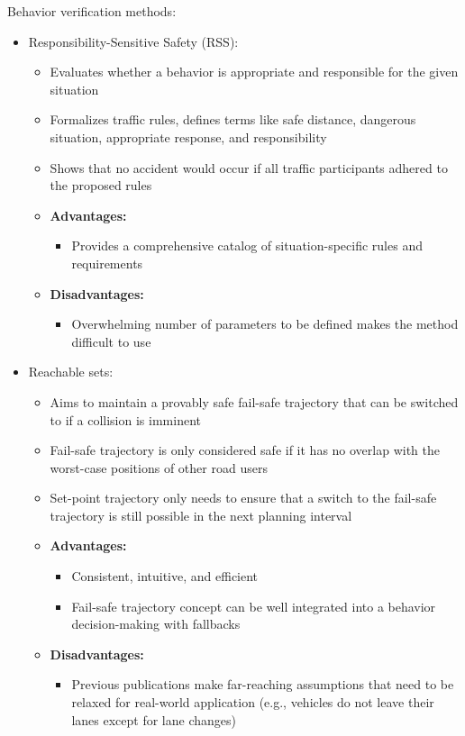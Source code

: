 Behavior verification methods:
\begin{itemize}
    \item Responsibility-Sensitive Safety (RSS):
          \begin{itemize}
              \item Evaluates whether a behavior is appropriate and responsible for the given situation
              \item Formalizes traffic rules, defines terms like safe distance, dangerous situation, appropriate response, and responsibility
              \item Shows that no accident would occur if all traffic participants adhered to the proposed rules
              \item \textbf{Advantages:}
                    \begin{itemize}
                        \item Provides a comprehensive catalog of situation-specific rules and requirements
                    \end{itemize}
              \item \textbf{Disadvantages:}
                    \begin{itemize}
                        \item Overwhelming number of parameters to be defined makes the method difficult to use
                    \end{itemize}
          \end{itemize}
    \item Reachable sets:
          \begin{itemize}
              \item Aims to maintain a provably safe fail-safe trajectory that can be switched to if a collision is imminent
              \item Fail-safe trajectory is only considered safe if it has no overlap with the worst-case positions of other road users
              \item Set-point trajectory only needs to ensure that a switch to the fail-safe trajectory is still possible in the next planning interval
              \item \textbf{Advantages:}
                    \begin{itemize}
                        \item Consistent, intuitive, and efficient
                        \item Fail-safe trajectory concept can be well integrated into a behavior decision-making with fallbacks
                    \end{itemize}
              \item \textbf{Disadvantages:}
                    \begin{itemize}
                        \item Previous publications make far-reaching assumptions that need to be relaxed for real-world application (e.g., vehicles do not leave their lanes except for lane changes)
                    \end{itemize}
          \end{itemize}
\end{itemize}

